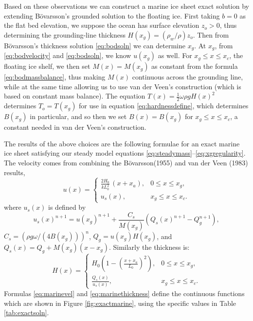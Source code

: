 \documentclass[review,letterpaper]{igs}
\renewcommand{\dh}{\fontencoding{T1}\selectfont{\symbol{240}}}
\newcommand{\bod}{B\"o\dh varsson\xspace}
\begin{document}
Based on these observations we can construct a marine ice sheet exact solution by extending \bod's grounded solution to the floating ice.  First taking $b=0$ as the flat bed elevation, we suppose the ocean has surface elevation $z_o>0$, thus determining the grounding-line thickness $H(x_g) = (\rho_w/\rho) z_o$.  Then from \bod's thickness solution \eqref{eq:bodsoln} we can determine $x_g$.  At $x_g$, from \eqref{eq:bodvelocity} and \eqref{eq:bodsoln}, we know $u(x_g)$ as well.  For $x_g \le x \le x_c$, the floating ice shelf, we then set $M(x) = M(x_g)$ as constant from the formula \eqref{eq:bodmassbalance}, thus making $M(x)$ continuous across the grounding line, while at the same time allowing us to use van der Veen's construction (which is based on constant mass balance).  The equation $T(x) = \frac{1}{2} \omega \rho g H(x)^2$ determines $T_o=T(x_g)$ for use in equation \eqref{eq:hardnessdefine}, which determines $B(x_g)$ in particular, and so then we set $B(x)=B(x_g)$ for $x_g \le x \le x_c$, a constant needed in van der Veen's construction.

The results of the above choices are the following formulae for an exact marine ice sheet satisfying our steady model equations \eqref{eq:steadymass}--\eqref{eq:xgregularity}.  The velocity comes from combining the \bod (1955) and van der Veen (1983) results,
\begin{equation}
u(x) = \begin{cases} \frac{2 H_0}{k L_0^2}\,(x + x_a), & 0 \le x \le x_g, \\
                     u_s(x), & x_g \le x \le x_c.
       \end{cases} \label{eq:marinevel}
\end{equation}
where $u_s(x)$ is defined by
\begin{equation}
u_s(x)^{n+1} = u(x_g)^{n+1} + \frac{C_s}{M(x_g)} \left(Q_s(x)^{n+1} - Q_g^{n+1}\right), \label{eq:vanderveenvel}
\end{equation}
$C_s = \left(\rho g \omega/(4 B(x_g))\right)^n$, $Q_g = u(x_g) H(x_g)$, and $Q_s(x) = Q_g + M(x_g) (x-x_g)$.  Similarly the thickness is:
\begin{equation}
H(x) = \begin{cases} H_0 \left(1 - (\frac{x+x_a}{L_0})^2\right), & 0 \le x \le x_g, \\
                     \frac{Q_s(x)}{u_s(x)}, & x_g \le x \le x_c.
       \end{cases} \label{eq:marinethickness}
\end{equation}
Formulas \eqref{eq:marinevel} and \eqref{eq:marinethickness} define the continuous functions which are shown in Figure \ref{fig:exactmarine}, using the specific values in Table \ref{tab:exactsoln}.
\end{document}
